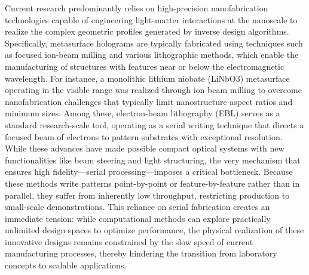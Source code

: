 \documentclass[11pt]{article}
\begin{document}
Current research predominantly relies on high-precision nanofabrication technologies capable of engineering light-matter interactions at the nanoscale to realize the complex geometric profiles generated by inverse design algorithms. Specifically, metasurface holograms are typically fabricated using techniques such as focused ion-beam milling and various lithographic methods, which enable the manufacturing of structures with features near or below the electromagnetic wavelength. For instance, a monolithic lithium niobate (LiNbO3) metasurface operating in the visible range was realized through ion beam milling to overcome nanofabrication challenges that typically limit nanostructure aspect ratios and minimum sizes. \citep{doi_10_1021_acsphotonics_1c00026_bdd15a92} Among these, electron-beam lithography (EBL) serves as a standard research-scale tool, operating as a serial writing technique that directs a focused beam of electrons to pattern substrates with exceptional resolution. \citep{doi_10_1088_1361_6528_ad3c4c_ac8a5241} \citep{doi_10_1021_acsomega_4c01044_0ad8ee05} While these advances have made possible compact optical systems with new functionalities like beam steering and light structuring, the very mechanism that ensures high fidelity---serial processing---imposes a critical bottleneck. Because these methods write patterns point-by-point or feature-by-feature rather than in parallel, they suffer from inherently low throughput, restricting production to small-scale demonstrations. This reliance on serial fabrication creates an immediate tension: while computational methods can explore practically unlimited design spaces to optimize performance, the physical realization of these innovative designs remains constrained by the slow speed of current manufacturing processes, thereby hindering the transition from laboratory concepts to scalable applications. \citep{doi_10_1021_acsphotonics_3c00572_fda8f742} \citep{doi_10_1002_inf2_12116_b5c46838}
\end{document}
